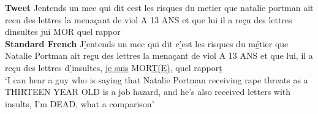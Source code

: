\begin{exe}
\ex 
\gll
\textbf{Tweet} 
Jentends un mec qui dit cest les risques du metier que natalie portman ait recu des lettres la menaçant de viol A 13 ANS et que lui il a reçu des lettres dinsultes jui MOR quel rappor
\\
\textbf{Standard French} 
J\underline{'}entends un mec qui dit c\underline{'}est les risques du m\underline{é}tier que Natalie Portman ait re\underline{ç}u des lettres la menaçant de viol A 13 ANS et que lui, il a reçu des lettres d\underline{'}insultes, \underline{je suis} MOR\underline{T(E)}, quel rappor\underline{t}
 \\
\trans `I can hear a guy who is saying that Natalie Portman receiving rape threats as a THIRTEEN YEAR OLD is a job hazard, and he's also received letters with insults, I'm DEAD, what a comparison'
\end{exe}

